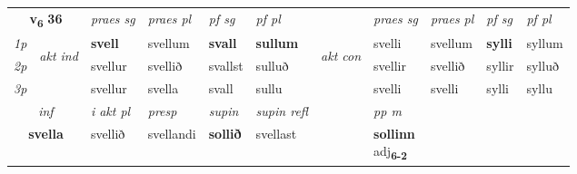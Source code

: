 \noindent
\begin{tabular}{lllllllllll} \toprule
\multicolumn{2}{c}{\textbf{v{\textsubscript{6}}} \Large{\textbf{36}}}  &  \textit{praes sg}  & \textit{praes pl}  &\textit{ pf sg} & \textit{pf pl} &  &  \textit{praes sg}  & \textit{praes pl}  & \textit{pf sg} & \textit{pf pl } \\*
	\cmidrule{3-6} \cmidrule{8-11}
 {\textit{1p}} & \multirow{3}{*}{\begin{turn}{90}\textit{akt ind}\end{turn}} & \textbf{svell} & svellum & \textbf{svall} & \textbf{sullum} & \multirow{3}{*}{\begin{turn}{90}\textit{akt con}\end{turn}} &svelli & svellum & \textbf{sylli} & syllum\\*
 {\textit{2p}} &  &  svellur  & svellið & svallst & sulluð & & svellir & svellið & syllir & sylluð \\*
{\textit{3p}} &  & svellur & svella & svall & sullu & & svelli & svelli& sylli & syllu \\*
\cmidrule{3-6} \cmidrule{8-11}

   \multicolumn{2}{c}{\textit{inf}}  & \textit{i akt pl}   & \textit{presp} & \textit{supin} & \textit{supin refl} && \textit{pp m} \\*
  \multicolumn{2}{c}{\textbf{svella}}   & svellið   & svellandi &  \textbf{sollið} & svellast && \specialcell{\textbf{sollinn} \\ adj\textbf{\textsubscript{6-2}}} \\*
\end{tabular}

